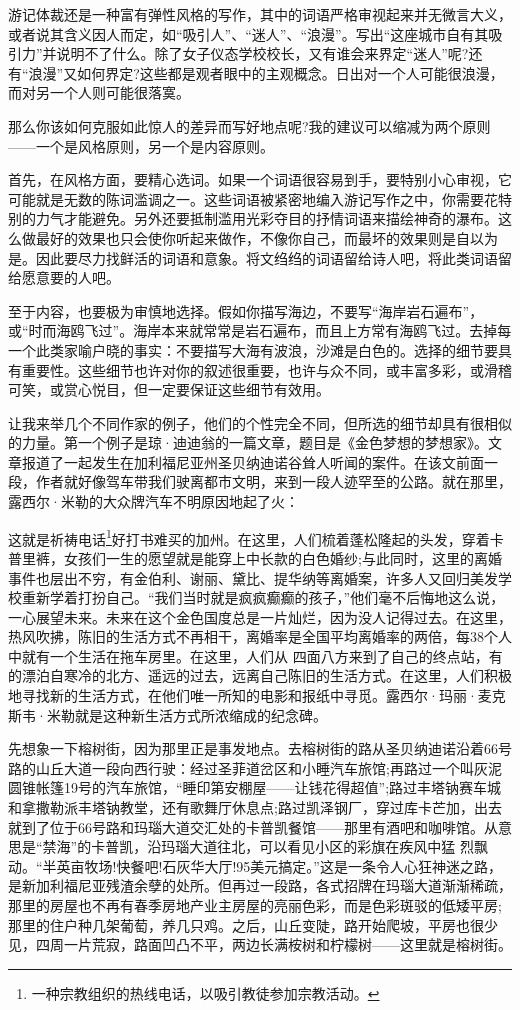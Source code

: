 游记体裁还是一种富有弹性风格的写作，其中的词语严格审视起来并无微言大义，或者说其含义因人而定，如“吸引人”、“迷人”、“浪漫”。写出“这座城市自有其吸引力”并说明不了什么。除了女子仪态学校校长，又有谁会来界定“迷人”呢?还有“浪漫”又如何界定?这些都是观者眼中的主观概念。日出对一个人可能很浪漫，而对另一个人则可能很落寞。

那么你该如何克服如此惊人的差异而写好地点呢?我的建议可以缩减为两个原则——一个是风格原则，另一个是内容原则。

首先，在风格方面，要精心选词。如果一个词语很容易到手，要特别小心审视，它可能就是无数的陈词滥调之一。这些词语被紧密地编入游记写作之中，你需要花特别的力气才能避免。另外还要抵制滥用光彩夺目的抒情词语来描绘神奇的瀑布。这么做最好的效果也只会使你听起来做作，不像你自己，而最坏的效果则是自以为是。因此要尽力找鲜活的词语和意象。将文绉绉的词语留给诗人吧，将此类词语留给愿意要的人吧。

至于内容，也要极为审慎地选择。假如你描写海边，不要写“海岸岩石遍布”，或“时而海鸥飞过”。海岸本来就常常是岩石遍布，而且上方常有海鸥飞过。去掉每一个此类家喻户晓的事实：不要描写大海有波浪，沙滩是白色的。选择的细节要具有重要性。这些细节也许对你的叙述很重要，也许与众不同，或丰富多彩，或滑稽可笑，或赏心悦目，但一定要保证这些细节有效用。

让我来举几个不同作家的例子，他们的个性完全不同，但所选的细节却具有很相似的力量。第一个例子是琼·迪迪翁的一篇文章，题目是《金色梦想的梦想家》。文章报道了一起发生在加利福尼亚州圣贝纳迪诺谷耸人听闻的案件。在该文前面一段，作者就好像驾车带我们驶离都市文明，来到一段人迹罕至的公路。就在那里，露西尔·米勒的大众牌汽车不明原因地起了火：

这就是祈祷电话\footnote{一种宗教组织的热线电话，以吸引教徒参加宗教活动。}好打书难买的加州。在这里，人们梳着蓬松隆起的头发，穿着卡普里裤，女孩们一生的愿望就是能穿上中长款的白色婚纱;与此同时，这里的离婚事件也层出不穷，有金伯利、谢丽、黛比、提华纳等离婚案，许多人又回归美发学校重新学着打扮自己。“我们当时就是疯疯癫癫的孩子，”他们毫不后悔地这么说，一心展望未来。未来在这个金色国度总是一片灿烂，因为没人记得过去。在这里，热风吹拂，陈旧的生活方式不再相干，离婚率是全国平均离婚率的两倍，每38个人中就有一个生活在拖车房里。在这里，人们从 四面八方来到了自己的终点站，有的漂泊自寒冷的北方、遥远的过去，远离自己陈旧的生活方式。在这里，人们积极地寻找新的生活方式，在他们唯一所知的电影和报纸中寻觅。露西尔·玛丽·麦克斯韦·米勒就是这种新生活方式所浓缩成的纪念碑。

先想象一下榕树街，因为那里正是事发地点。去榕树街的路从圣贝纳迪诺沿着66号路的山丘大道一段向西行驶：经过圣菲道岔区和小睡汽车旅馆;再路过一个叫灰泥圆锥帐篷19号的汽车旅馆，“睡印第安棚屋——让钱花得超值”;路过丰塔钠赛车城和拿撒勒派丰塔钠教堂，还有歌舞厅休息点;路过凯泽钢厂，穿过库卡芒加，出去就到了位于66号路和玛瑙大道交汇处的卡普凯餐馆——那里有酒吧和咖啡馆。从意思是“禁海”的卡普凯，沿玛瑙大道往北，可以看见小区的彩旗在疾风中猛 烈飘动。“半英亩牧场!快餐吧!石灰华大厅!95美元搞定。”这是一条令人心狂神迷之路，是新加利福尼亚残渣余孽的处所。但再过一段路，各式招牌在玛瑙大道渐渐稀疏，那里的房屋也不再有春季房地产业主房屋的亮丽色彩，而是色彩斑驳的低矮平房;那里的住户种几架葡萄，养几只鸡。之后，山丘变陡，路开始爬坡，平房也很少见，四周一片荒寂，路面凹凸不平，两边长满桉树和柠檬树——这里就是榕树街。

